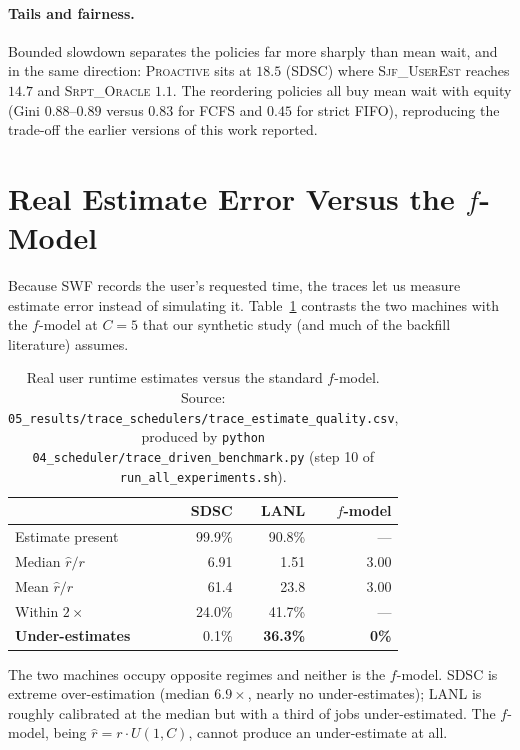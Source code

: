 \documentclass[11pt,twocolumn]{article}
\begin{document}
\paragraph{Tails and fairness.}
Bounded slowdown separates the policies far more sharply than mean wait, and in
the same direction: \textsc{Proactive} sits at $18.5$ (SDSC) where
\textsc{Sjf\_UserEst} reaches $14.7$ and \textsc{Srpt\_Oracle} $1.1$. The
reordering policies all buy mean wait with equity (Gini $0.88$--$0.89$ versus
$0.83$ for FCFS and $0.45$ for strict FIFO), reproducing the trade-off the
earlier versions of this work reported.

\section{Real Estimate Error Versus the $f$-Model}
\label{sec:estimates}

Because SWF records the user's requested time, the traces let us measure
estimate error instead of simulating it. Table~\ref{tab:est} contrasts the two
machines with the $f$-model at $C = 5$ that our synthetic study (and much of the
backfill literature) assumes.

\begin{table}[h]
\centering
\small
\begin{tabular}{lrrr}
\toprule
 & SDSC & LANL & $f$-model \\
\midrule
Estimate present      & 99.9\% & 90.8\% & --- \\
Median $\hat r / r$   & 6.91 & 1.51 & 3.00 \\
Mean $\hat r / r$     & 61.4 & 23.8 & 3.00 \\
Within $2\times$      & 24.0\% & 41.7\% & --- \\
\textbf{Under-estimates} & 0.1\% & \textbf{36.3\%} & \textbf{0\%} \\
\bottomrule
\end{tabular}
\caption{Real user runtime estimates versus the standard $f$-model.
{\small Source:
\texttt{05\_results/trace\_schedulers/trace\_estimate\_quality.csv},
produced by \texttt{python 04\_scheduler/trace\_driven\_benchmark.py} (step 10
of \texttt{run\_all\_experiments.sh}).}}
\label{tab:est}
\end{table}

The two machines occupy opposite regimes and neither is the $f$-model. SDSC is
extreme over-estimation (median $6.9\times$, nearly no under-estimates); LANL is
roughly calibrated at the median but with a third of jobs under-estimated. The
$f$-model, being $\hat r = r \cdot U(1, C)$, cannot produce an under-estimate at
all.
\end{document}
